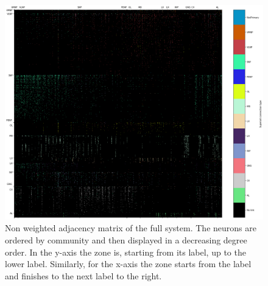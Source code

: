 \begin{figure}
    \centering
    \includegraphics[width=\textwidth]{Images/Communities/Adj_matrix.png}
    \caption{Non weighted adjacency matrix of the full system. The neurons are ordered by community
    and then displayed in a decreasing degree order. In the y-axis the zone is, starting from its label, 
    up to the lower label. Similarly, for the x-axis the zone starts from the label and finishes to the next
    label to the right.}
    \label{fig:adj}
\end{figure}

